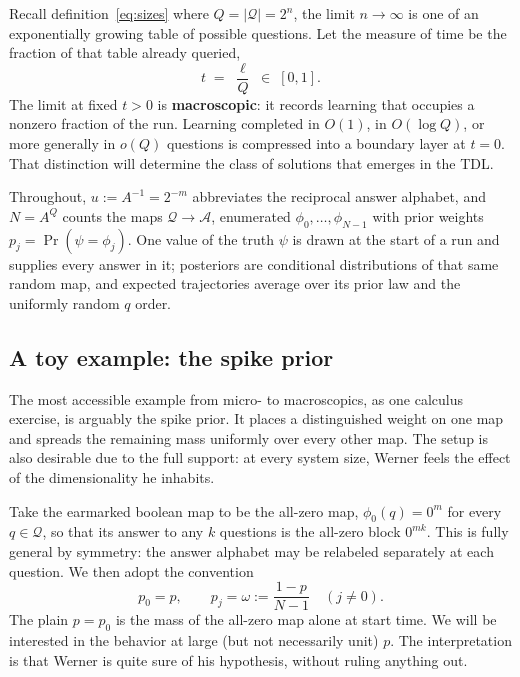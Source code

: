 \documentclass[11pt]{article}
\begin{document}
Recall definition~\ref{eq:sizes} where $Q = |\mathcal Q| = 2^n$, the limit $n \to \infty$ is
one of an exponentially growing table of possible questions. Let the measure of time be the
fraction of that table already queried,
%
\begin{equation}
  t \;=\; \frac{\ell}{Q} \;\in\; [0,1].
  \label{eq:askedfraction}
\end{equation}
%
The limit at fixed $t > 0$ is \textbf{macroscopic}: it records learning
that occupies a nonzero fraction of the run. Learning completed in
$O(1)$, in $O(\log Q)$, or more generally in $o(Q)$ questions is
compressed into a boundary layer at $t = 0$. That distinction
will determine the class of solutions that emerges in the TDL.

Throughout, $u := A^{-1} = 2^{-m}$ abbreviates the reciprocal answer
alphabet, and $N = A^{Q}$ counts the maps
$\mathcal Q \to \mathcal A$, enumerated $\phi_0, \ldots, \phi_{N-1}$
with prior weights $p_j = \Pr(\psi = \phi_j)$. One value of the truth
$\psi$ is drawn at the start of a run and supplies every answer in
it; posteriors are conditional distributions of that same random map,
and expected trajectories average over its prior law and the uniformly random $q$ order.

\subsection{A toy example: the spike prior}\label{sec:spike}

The most accessible example from micro- to macroscopics, as one calculus exercise,
is arguably the spike prior. It places a distinguished weight on one map and spreads
the remaining mass uniformly over every other map. The setup is also desirable due to the full
support: at every system size, Werner feels the effect of the dimensionality he inhabits.

Take the earmarked boolean
map to be the all-zero map, $\phi_0(q) = 0^m$ for every
$q \in \mathcal Q$, so that its answer to any $k$ questions is the
all-zero block $0^{mk}$. This is fully general by symmetry: the answer
alphabet may be relabeled separately at each question. We then adopt the convention
%
\begin{equation}
  p_0 = p,
  \qquad
  p_j = \omega := \frac{1-p}{N-1}
  \quad (j \neq 0).
  \label{eq:spikeprior}
\end{equation}
%
The plain $p = p_0$ is the mass of the all-zero map alone at start time. We will be interested in the behavior at large (but not necessarily unit) $p$.
The interpretation is that Werner is quite sure of his hypothesis, without ruling anything out.
\end{document}
